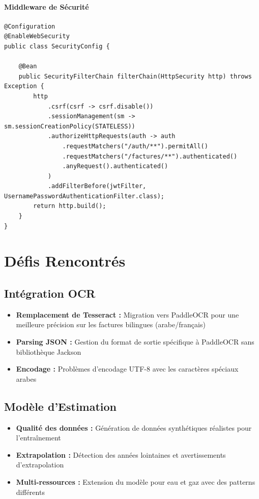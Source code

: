 \documentclass[12pt,a4paper]{article}
\begin{document}
\paragraph{Middleware de Sécurité}
\begin{lstlisting}[style=java, caption=Configuration JWT et Sécurité]
@Configuration
@EnableWebSecurity
public class SecurityConfig {

    @Bean
    public SecurityFilterChain filterChain(HttpSecurity http) throws Exception {
        http
            .csrf(csrf -> csrf.disable())
            .sessionManagement(sm -> sm.sessionCreationPolicy(STATELESS))
            .authorizeHttpRequests(auth -> auth
                .requestMatchers("/auth/**").permitAll()
                .requestMatchers("/factures/**").authenticated()
                .anyRequest().authenticated()
            )
            .addFilterBefore(jwtFilter, UsernamePasswordAuthenticationFilter.class);
        return http.build();
    }
}
\end{lstlisting}

\section{Défis Rencontrés}

\subsection{Intégration OCR}
\begin{itemize}
    \item \textbf{Remplacement de Tesseract :} Migration vers PaddleOCR pour une meilleure précision sur les factures bilingues (arabe/français)
    \item \textbf{Parsing JSON :} Gestion du format de sortie spécifique à PaddleOCR sans bibliothèque Jackson
    \item \textbf{Encodage :} Problèmes d'encodage UTF-8 avec les caractères spéciaux arabes
\end{itemize}

\subsection{Modèle d'Estimation}
\begin{itemize}
    \item \textbf{Qualité des données :} Génération de données synthétiques réalistes pour l'entraînement
    \item \textbf{Extrapolation :} Détection des années lointaines et avertissements d'extrapolation
    \item \textbf{Multi-ressources :} Extension du modèle pour eau et gaz avec des patterns différents
\end{itemize}
\end{document}
